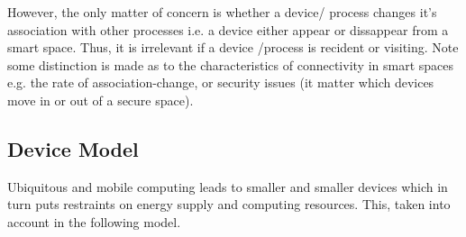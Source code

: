 However, the only matter of concern is whether a device/ process changes it's association with other processes i.e. a device either appear or dissappear from a smart space. Thus, it is irrelevant if a device /process is recident or visiting. Note some distinction is made as to the characteristics of connectivity in smart spaces e.g. the rate of association-change, or security issues (it matter which devices move in or out of a secure space). \\

\subsection{Device Model}
Ubiquitous and mobile computing leads to smaller and smaller devices which in turn puts restraints on energy supply and computing resources. This, taken into account in the following model.\\

